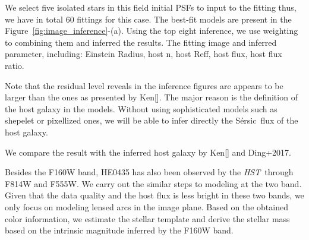 \documentclass[fleqn,usenatbib]{mnras}
\newcommand{\hst}{{\it HST}}
\newcommand{\sersic}{S\'ersic}
\begin{document}
We select five isolated stars in this field initial PSFs to input to the fitting thus, we have in total 60 fittings for this case. The best-fit models are present in the Figure~\ref{fig:image_inference}-(a). Using the top eight inference, we use weighting to combining them and inferred the results. 
The fitting image and inferred parameter, including: Einstein Radius, host n, host Reff, host flux, host flux ratio.

Note that the residual level reveals in the inference figures are appears to be larger than the ones as presented by Ken[]. The major reason is the definition of the host galaxy in the models. Without using sophisticated models such as shepelet or pixellized ones, we will be able to infer directly the \sersic\ flux of the host galaxy.

We compare the result with the inferred host galaxy by Ken[] and Ding+2017.

Besides the F160W band, HE0435 has also been observed by the \hst\ through F814W and F555W. We carry out the similar steps to modeling at the two band. Given that the data quality and the host flux is less bright in these two bands, we only focus on modeling lensed arcs in the image plane. Based on the obtained color information, we estimate the stellar template and derive the stellar mass based on the intrinsic magnitude inferred by the F160W band.
\end{document}

